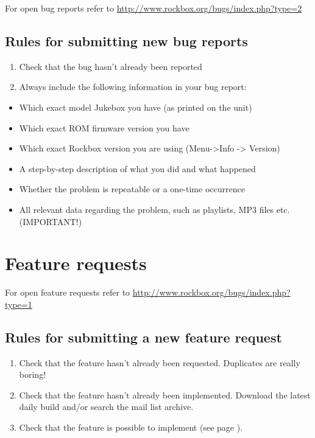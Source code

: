 For open bug reports refer to
\url{http://www.rockbox.org/bugs/index.php?type=2}

\subsection{Rules for submitting new bug reports}

\begin{enumerate}
\item  Check that the bug hasn't already been reported
\item  Always include the following information in your bug report:
\end{enumerate}

\begin{itemize}
\item  Which exact model Jukebox you have (as printed on the unit)
\item  Which exact ROM firmware version you have
\item  Which exact Rockbox version you are using
(Menu{}-{\textgreater}Info {}-{\textgreater} Version)
\item  A step{}-by{}-step description of what you did and what happened
\item  Whether the problem is repeatable or a one{}-time occurrence
\item  All relevant data regarding the problem, such as playlists, MP3
files etc. (IMPORTANT!) 
\end{itemize}

\section{Feature requests}
For open feature requests refer to
\url{http://www.rockbox.org/bugs/index.php?type=1}

\subsection{Rules for submitting a new feature request}

\begin{enumerate}
\item Check that the feature hasn't already been requested. Duplicates are really boring!
\item Check that the feature hasn't already been implemented. Download the latest daily build and/or search the mail list archive.
\item Check that the feature is possible to implement (see page \pageref{ref:NODO}).
\end{enumerate}

